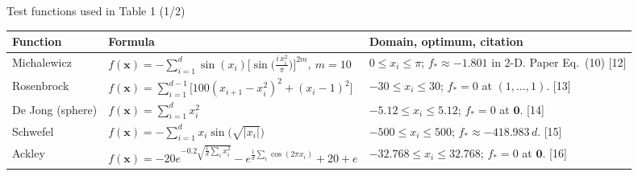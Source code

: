 \documentclass[aspectratio=169,11pt]{beamer}
\begin{document}
\begin{frame}[t]{Test functions used in Table 1 (1/2)}
\scriptsize
\renewcommand{\arraystretch}{1.25}\setlength{\tabcolsep}{3pt}
\begin{tabular}{@{}p{}p{}p{}@{}}
\toprule
\textbf{Function} & \textbf{Formula} & \textbf{Domain, optimum, citation}\\\midrule
Michalewicz & $\displaystyle f(\mathbf{x})=-\sum_{i=1}^{d}\sin(x_i)\Big[\sin\!\Big(\tfrac{i\,x_i^{2}}{\pi}\Big)\Big]^{2m},\ m=10$ & $0\le x_i\le\pi$; $f_*\approx-1.801$ in 2-D. Paper Eq.~(10) [12]\\
Rosenbrock & $\displaystyle f(\mathbf{x})=\sum_{i=1}^{d-1}\big[100(x_{i+1}-x_i^{2})^{2}+(x_i-1)^{2}\big]$ & $-30\le x_i\le30$; $f_*=0$ at $(1,\dots,1)$. [13]\\
De Jong (sphere) & $\displaystyle f(\mathbf{x})=\sum_{i=1}^{d}x_i^{2}$ & $-5.12\le x_i\le5.12$; $f_*=0$ at $\mathbf{0}$. [14]\\
Schwefel & $\displaystyle f(\mathbf{x})=-\sum_{i=1}^{d}x_i\sin\!\big(\sqrt{|x_i|}\big)$ & $-500\le x_i\le500$; $f_*\approx-418.983\,d$. [15]\\
Ackley & $\displaystyle f(\mathbf{x})=-20e^{-0.2\sqrt{\frac1d\sum_{i}x_i^{2}}}-e^{\frac1d\sum_{i}\cos(2\pi x_i)}+20+e$ & $-32.768\le x_i\le32.768$; $f_*=0$ at $\mathbf{0}$. [16]\\
\bottomrule
\end{tabular}
\end{frame}
\end{document}
